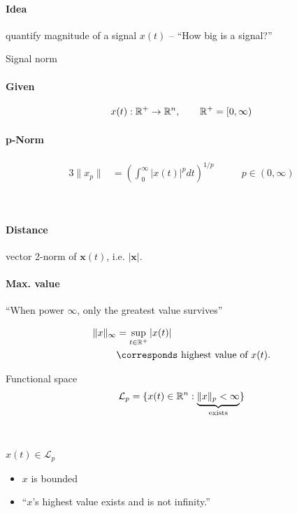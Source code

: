 \paragraph{Idea} quantify magnitude of a signal $x(t)$
-- ``How big is a signal?''\\

\begin{definition}{Signal norm}
    \paragraph{Given}
    \begin{alignat*}{3}
    x(t): \mathbb{R}^+ \rightarrow \mathbb{R}^n, \quad  \quad \mathbb{R}^+ = [0, \infty)
    \end{alignat*}

    \paragraph{p-Norm}
        \begin{alignat*}{3}
        \|x_p\| &= \left( \int_0^\infty |x(t)|^p dt \right)^{1/p}
            & \qquad p \in (0, \infty)
        \end{alignat*}
\end{definition}~

\paragraph{Distance} vector 2-norm of $\bm{x}(t)$,
i.e. $|\bm{x}|$.

\paragraph{Max. value}
``When power $\infty$, only the greatest value survives''

\begin{alignat*}{3}
\|x\|_\infty &= \sup_{t \in \R^+} |x(t)|\\
    & \corresponds \txt{ highest value of } x (t).
\end{alignat*}

\begin{definition}{Functional space}
\begin{alignat*}{3}
\mathcal{L}_p = \{x(t) \in \mathbb{R}^n : \underbrace{\| x \|_p < \infty}_{\textnormal{exists}} \}
\end{alignat*}
\end{definition}~

$x(t) \in \mathcal{L}_p$
\begin{itemize}
\item $x$ is bounded
\item ``$x$'s highest value exists and is not infinity.''
\end{itemize}~ \\

